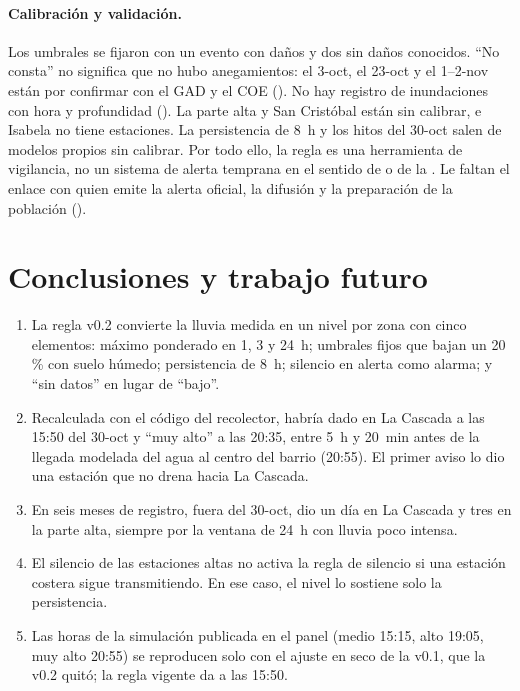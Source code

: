 \documentclass{sosg-informe}
\begin{document}
\paragraph{Calibración y validación.} Los umbrales se fijaron con un evento con daños y dos sin daños conocidos. \enquote{No consta} no significa que no hubo anegamientos: el 3-oct, el 23-oct y el 1--2-nov están por confirmar con el GAD y el COE (). No hay registro de inundaciones con hora y profundidad (). La parte alta y San Cristóbal están sin calibrar, e Isabela no tiene estaciones. La persistencia de 8~h y los hitos del 30-oct salen de modelos propios sin calibrar. Por todo ello, la regla es una herramienta de vigilancia, no un sistema de alerta temprana en el sentido de \citet{basher2006} o de la \citet{wmo2018}. Le faltan el enlace con quien emite la alerta oficial, la difusión y la preparación de la población ().

\section{Conclusiones y trabajo futuro}
\begin{enumerate}
  \item La regla v0.2 convierte la lluvia medida en un nivel por zona con cinco elementos: máximo ponderado en 1, 3 y 24~h; umbrales fijos que bajan un 20\,\% con suelo húmedo; persistencia de 8~h; silencio en alerta como alarma; y \enquote{sin datos} en lugar de \enquote{bajo}.
  \item Recalculada con el código del recolector, habría dado \alto{} en La Cascada a las 15:50 del 30-oct y \enquote{muy alto} a las 20:35, entre 5~h y 20~min antes de la llegada modelada del agua al centro del barrio (20:55). El primer aviso lo dio una estación que no drena hacia La Cascada.
  \item En seis meses de registro, fuera del 30-oct, dio \alto{} un día en La Cascada y tres en la parte alta, siempre por la ventana de 24~h con lluvia poco intensa.
  \item El silencio de las estaciones altas no activa la regla de silencio si una estación costera sigue transmitiendo. En ese caso, el nivel lo sostiene solo la persistencia.
  \item Las horas de la simulación publicada en el panel (medio 15:15, alto 19:05, muy alto 20:55) se reproducen solo con el ajuste en seco de la v0.1, que la v0.2 quitó; la regla vigente da \alto{} a las 15:50.
\end{enumerate}
\end{document}
